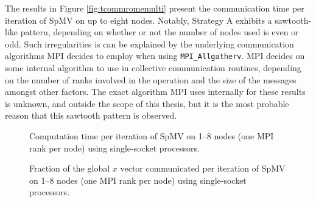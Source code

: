 The results in Figure \ref{fig:tcommromemulti} present the communication time per iteration of SpMV on up to eight \romeq{} nodes. Notably, Strategy A exhibits a sawtooth-like pattern, depending on whether or not the number of nodes used is even or odd. Such irregularities is can be explained by the underlying communication algorithms MPI decides to employ when using \texttt{MPI\_Allgatherv}. MPI decides on some internal algorithm to use in collective communication routines, depending on the number of ranks involved in the operation and the size of the messages amongst other factors. The exact algorithm MPI uses internally for these results is unknown, and outside the scope of this thesis, but it is the most probable reason that this sawtooth pattern is observed.




\begin{figure}[H]
    \centering
    \caption{Computation time per iteration of SpMV on 1–8 nodes (one MPI rank per node) using single-socket \romeq{} processors.}
    \label{fig:tcomp_2x4_multi_rome16q}
\end{figure}

\begin{figure}[H]
    \centering
    \caption{Fraction of the global \(x\) vector communicated per iteration of SpMV on 1–8 nodes (one MPI rank per node) using single-socket \romeq{} processors.}
    \label{fig:commlaoadromemulti}
\end{figure}
